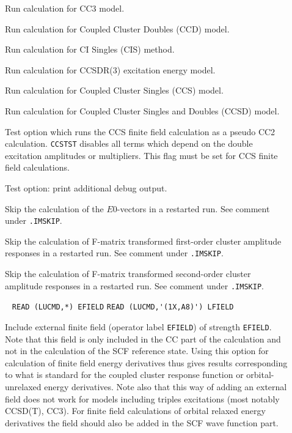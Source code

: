 \begin{description}
\item[]     
        Run calculation for CC3 model.
%
\item[]    
        Run calculation for Coupled Cluster Doubles
        (CCD) model. 
%
\item[]    
        Run calculation for CI Singles (CIS) method. 
%
\item[] 
        Run calculation for CCSDR(3) excitation energy model.
%
\item[] 
        Run calculation for Coupled Cluster Singles
        (CCS) model. 
%
\item[]   
        Run calculation for Coupled Cluster Singles and Doubles
        (CCSD) model. 
%
\item[] 
   Test option which runs the CCS finite field calculation as a pseudo CC2
   calculation. \verb+CCSTST+ disables all terms which depend on the
   double excitation amplitudes or multipliers. This flag must be
   set for CCS finite field calculations.
%
\item[]  
   Test option: print additional debug output.
%
\item[] 
   Skip the calculation of the $E0$-vectors 
   in a restarted run. See comment under \verb|.IMSKIP|.
%
\item[] 
   Skip the calculation of F-matrix transformed first-order
   cluster amplitude responses in a restarted run. See comment under \verb|.IMSKIP|.
%
\item[] 
   Skip the calculation of F-matrix transformed second-order
   cluster amplitude responses in a restarted run. See comment under \verb|.IMSKIP|.
%
\item[] \verb| |\newline
    \verb|READ (LUCMD,*) EFIELD|\newline
    \verb|READ (LUCMD,'(1X,A8)') LFIELD|

    Include external finite field (operator label \verb+EFIELD+)
    of strength \verb+EFIELD+. Note that this field is only included
    in the CC part of the calculation and not in the calculation of the
    SCF reference state. Using this option for calculation of finite field energy
    derivatives thus gives results corresponding to what is standard for the coupled cluster
    response function or orbital-unrelaxed energy derivatives.
    Note also that this way of adding an external field does not work for models including
    triples excitations (most notably CCSD(T), CC3).
    For finite field calculations of orbital relaxed energy derivatives the field
    should also be added in the SCF wave function part.
 

\end{description}
